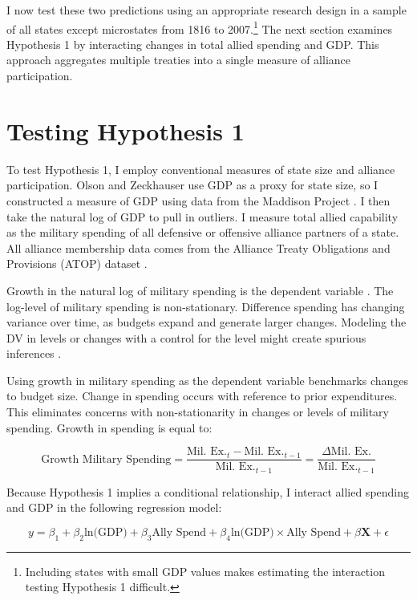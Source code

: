 \documentclass[12pt]{article}
\begin{document}
I now test these two predictions using an appropriate research design in a sample of all states except microstates from 1816 to 2007.\footnote{Including states with small GDP values makes estimating the interaction testing Hypothesis 1 difficult.}
The next section examines Hypothesis 1 by interacting changes in total allied spending and GDP.
This approach aggregates multiple treaties into a single measure of alliance participation. 


\section{Testing Hypothesis 1}

To test Hypothesis 1, I employ conventional measures of state size and alliance participation. 
Olson and Zeckhauser use GDP as a proxy for state size, so I constructed a measure of GDP using data from the Maddison Project \citep{Boltetal2018}. 
I then take the natural log of GDP to pull in outliers. 
I measure total allied capability as the military spending of all defensive or offensive alliance partners of a state.
All alliance membership data comes from the Alliance Treaty Obligations and Provisions (ATOP) dataset \citep{Leedsetal2002}.  


Growth in the natural log of military spending is the dependent variable \citep{SingerCINC1988}. 
The log-level of military spending is non-stationary.
Difference spending has changing variance over time, as budgets expand and generate larger changes. 
Modeling the DV in levels or changes with a control for the level might create spurious inferences \citep{GrangerNewbold1974}. 


Using growth in military spending as the dependent variable benchmarks changes to budget size. 
Change in spending occurs with reference to prior expenditures. 
This eliminates concerns with non-stationarity in changes or levels of military spending.
Growth in spending is equal to: 


\begin{equation}
\mbox{Growth Military Spending} = \frac{\mbox{Mil. Ex.}_t - \mbox{Mil. Ex.}_{t-1} }{ \mbox{Mil. Ex.}_{t-1} } = \frac{\Delta \mbox{Mil. Ex.} }{ \mbox{Mil. Ex.}_{t-1} }
\end{equation} 


Because Hypothesis 1 implies a conditional relationship, I interact allied spending and GDP in the following regression model:

\begin{equation} 
y = \beta_1 + \beta_2 \mbox{ln(GDP)} + \beta_3 \mbox{Ally Spend} + \beta_4 \mbox{ln(GDP)} \times \mbox{Ally Spend} + \beta \textbf{X} + \epsilon
\end{equation}
\end{document}
